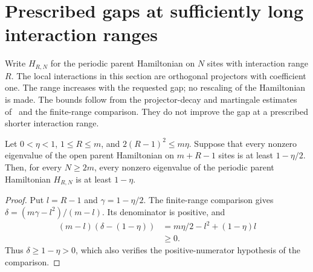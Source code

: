 \section{Prescribed gaps at sufficiently long interaction ranges}

Write $H_{R,N}$ for the periodic parent Hamiltonian on $N$ sites with
interaction range $R$. The local interactions in this section are orthogonal
projectors with coefficient one. The range increases with the requested gap; no rescaling
of the Hamiltonian is made. The bounds follow from the projector-decay and
martingale estimates of~\cite[Theorem~2.1 and Section~6]{Nachtergaele1996Spectral}
and the finite-range comparison. They do not improve the gap at a prescribed
shorter interaction range.

\begin{lemma}
    \label{thm:parent-prescribed-gap-window}
    \leanok
    Let $0<\eta<1$, $1\le R\le m$, and
    $2(R-1)^2\le m\eta$. Suppose that every nonzero eigenvalue of the open
    parent Hamiltonian on $m+R-1$ sites is at least $1-\eta/2$. Then, for
    every $N\ge2m$, every nonzero eigenvalue of the periodic parent
    Hamiltonian $H_{R,N}$ is at least $1-\eta$.
\end{lemma}
\begin{proof}
    \leanok
    Put $l=R-1$ and $\gamma=1-\eta/2$. The finite-range comparison
    gives $\delta=(m\gamma-l^2)/(m-l)$. Its denominator is positive,
    and
    \begin{align}
        (m-l)(\delta-(1-\eta))
         & =m\eta/2-l^2+(1-\eta)l \\
         & \ge0.
    \end{align}
    Thus $\delta\ge1-\eta>0$, which also verifies the positive-numerator
    hypothesis of the comparison.
\end{proof}

